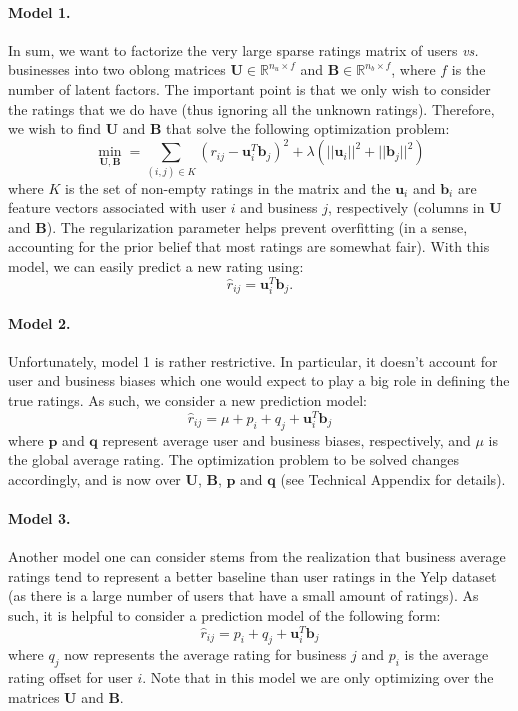 \documentclass[12pt]{article}
\newcommand{\mbf}[1]{\mathbf{#1}}
\begin{document}
\begin{multicols}{2}
\paragraph{Model 1.} In sum, we want to factorize the very large sparse ratings matrix of users \emph{vs.} businesses into two oblong matrices $\mbf U\in\mathbb{R}^{n_u\times f}$ and $\mbf B\in\mathbb{R}^{n_b\times f}$, where $f$ is the number of latent factors. The important point is that we only wish to consider the ratings that we do have (thus ignoring all the unknown ratings). Therefore, we wish to find $\mbf U$ and $\mbf B$ that solve the following optimization problem:
\begin{equation}
\min_{\mbf U,\mbf B} = \sum_{(i,j)\in K} (r_{ij}-\mbf u_i^T\mbf b_j)^2+\lambda\left(||\mbf u_i||^2+||\mbf b_j||^2\right)
\end{equation}
where $K$ is the set of non-empty ratings in the matrix and the $\mbf u_i$ and $\mbf b_i$ are feature vectors associated with user $i$ and business $j$, respectively (columns in $\mbf U$ and $\mbf B$). The regularization parameter helps prevent overfitting (in a sense, accounting for the prior belief that most ratings are somewhat fair). With this model, we can easily predict a new rating using:
\begin{equation}
\hat r_{ij} = \mbf u_i^T\mbf b_j.
\end{equation}

\paragraph{Model 2.} Unfortunately, model 1 is rather restrictive. In particular, it doesn't account for user and business biases which one would expect to play a big role in defining the true ratings. As such, we consider a new prediction model:
\begin{equation}
\hat r_{ij} = \mu + p_i + q_j + \mbf u_i^T\mbf b_j
\end{equation}
where $\mbf p$ and $\mbf q$ represent average user and business biases, respectively, and $\mu$ is the global average rating. The optimization problem to be solved changes accordingly, and is now over $\mbf U$, $\mbf B$, $\mbf p$ and $\mbf q$ (see Technical Appendix for details).

\paragraph{Model 3.} Another model one can consider stems from the realization that business average ratings tend to represent a better baseline than user ratings in the Yelp dataset (as there is a large number of users that have a small amount of ratings). As such, it is helpful to consider a prediction model of the following form:
\begin{equation}
\hat r_{ij} =  p_i + q_j + \mbf u_i^T\mbf b_j
\end{equation}
where $q_j$ now represents the average rating for business $j$ and $p_i$ is the average rating offset for user $i$. Note that in this model we are only optimizing over the matrices $\mbf U$ and $\mbf B$. 


\end{multicols}
\end{document}
